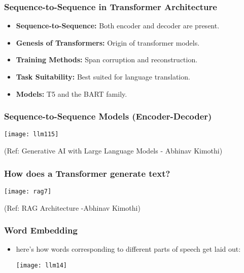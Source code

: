 \begin{frame}[fragile]\frametitle{Sequence-to-Sequence in Transformer Architecture}
\begin{itemize}
    \item \textbf{Sequence-to-Sequence:} Both encoder and decoder are present.
    \item \textbf{Genesis of Transformers:} Origin of transformer models.
    \item \textbf{Training Methods:} Span corruption and reconstruction.
    \item \textbf{Task Suitability:} Best suited for language translation.
    \item \textbf{Models:} T5 and the BART family.
\end{itemize}
\end{frame}

\begin{frame}[fragile]\frametitle{Sequence-to-Sequence Models (Encoder-Decoder)}

	\begin{center}
	\texttt{[image: llm115]}
	\end{center}

	{\tiny (Ref: Generative AI with Large Language Models - Abhinav  Kimothi)}

\end{frame}


\begin{frame}[fragile]\frametitle{How does a Transformer generate text?}


		\begin{center}
		\texttt{[image: rag7]}
		\end{center}

{\tiny (Ref: RAG Architecture -Abhinav  Kimothi)}

\end{frame}


\begin{frame}[fragile]\frametitle{Word Embedding}

\begin{itemize}

\item here’s how words corresponding to different parts of speech get laid out:

\begin{center}
\texttt{[image: llm14]}
\end{center}

\end{itemize}

\end{frame}




